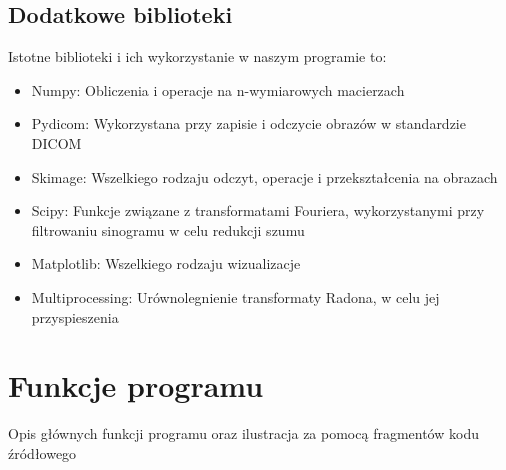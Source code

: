\documentclass[11pt]{article}
\begin{document}
\subsection{Dodatkowe biblioteki}
Istotne biblioteki i ich wykorzystanie w naszym programie to:
\begin{itemize}
    \item Numpy: Obliczenia i operacje na n-wymiarowych macierzach
    \item Pydicom: Wykorzystana przy zapisie i odczycie obrazów w standardzie DICOM
    \item Skimage:  Wszelkiego rodzaju odczyt, operacje i przekształcenia na obrazach
    \item Scipy: Funkcje związane z transformatami Fouriera, wykorzystanymi przy filtrowaniu sinogramu w celu redukcji szumu
    \item Matplotlib: Wszelkiego rodzaju wizualizacje
    \item Multiprocessing: Urównolegnienie transformaty Radona, w celu jej przyspieszenia
\end{itemize}

\section{Funkcje programu}

Opis głównych funkcji programu oraz ilustracja za pomocą fragmentów kodu źródłowego
\end{document}
